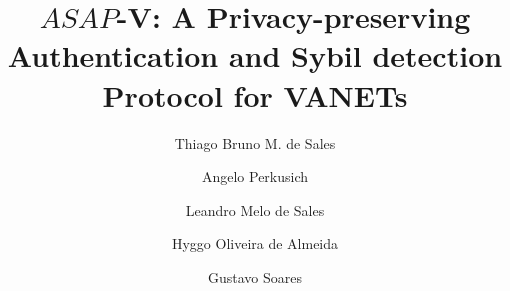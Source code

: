 \documentclass[preprint,12pt]{elsarticle}
\begin{document}
\begin{frontmatter}



\title{$ASAP$-V: A Privacy-preserving Authentication and Sybil detection Protocol for VANETs}


%
%


%



\author[label1]{Thiago Bruno M. de Sales}
\author[label1]{Angelo Perkusich}
\author[label1]{Leandro Melo de Sales}
\author[label1]{Hyggo Oliveira de  Almeida}
\author[label1]{Gustavo Soares}
\address[label1]{Embedded Systems and Pervasive Computing Laboratory, Federal University of Campina Grande, Campina Grande, PB, Brazil}


\end{frontmatter}
\end{document}
